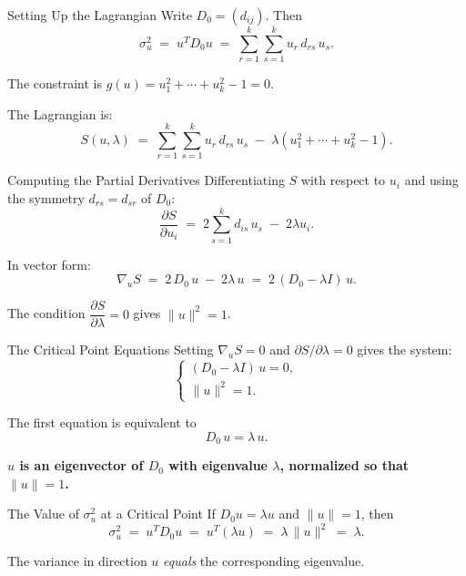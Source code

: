 \documentclass[aspectratio=169]{beamer}
\newcommand{\norm}[1]{\lVert #1 \rVert}
\begin{document}
\begin{frame}{Setting Up the Lagrangian}
  Write $D_{0} = (d_{ij})$.  Then
  \[
    \sigma_{u}^{2} \;=\; u^{T}D_{0}u
    \;=\; \sum_{r=1}^{k}\sum_{s=1}^{k} u_{r}\,d_{rs}\,u_{s}.
  \]

  \medskip
  The constraint is $g(u) = u_{1}^{2}+\cdots+u_{k}^{2}-1 = 0$.

  \medskip
  The Lagrangian is:
  \[
    S(u,\lambda)
    \;=\; \sum_{r=1}^{k}\sum_{s=1}^{k} u_{r}\,d_{rs}\,u_{s}
    \;-\; \lambda\!\left(u_{1}^{2}+\cdots+u_{k}^{2}-1\right).
  \]
\end{frame}

\begin{frame}{Computing the Partial Derivatives}
  Differentiating $S$ with respect to $u_{i}$ and using the symmetry
  $d_{rs} = d_{sr}$ of $D_{0}$:
  \[
    \frac{\partial S}{\partial u_{i}}
    \;=\; 2\sum_{s=1}^{k} d_{is}\,u_{s} \;-\; 2\lambda u_{i}.
  \]

  \medskip
  In vector form:
  \[
    \nabla_{u} S
    \;=\; 2\,D_{0}\,u \;-\; 2\lambda\,u
    \;=\; 2\,(D_{0} - \lambda I)\,u.
  \]

  \medskip
  The condition $\dfrac{\partial S}{\partial\lambda}=0$ gives $\norm{u}^{2}=1$.
\end{frame}

\begin{frame}{The Critical Point Equations}
  Setting $\nabla_{u} S = 0$ and $\partial S/\partial\lambda = 0$ gives
  the system:
  \[
    \begin{cases}
      (D_{0} - \lambda I)\,u = 0, \\[4pt]
      \norm{u}^{2} = 1.
    \end{cases}
  \]

  \medskip
  The first equation is equivalent to
  \[
    \boxed{D_{0}\,u = \lambda\,u.}
  \]

  \bigskip
  \begin{center}
    \textbf{$u$ is an eigenvector of $D_{0}$ with eigenvalue $\lambda$,
    normalized so that $\norm{u}=1$.}
  \end{center}
\end{frame}

\begin{frame}{The Value of $\sigma_{u}^{2}$ at a Critical Point}
  If $D_{0}u = \lambda u$ and $\norm{u}=1$, then
  \[
    \sigma_{u}^{2}
    \;=\; u^{T}D_{0}u
    \;=\; u^{T}(\lambda u)
    \;=\; \lambda\,\norm{u}^{2}
    \;=\; \lambda.
  \]

  \medskip
  The variance in direction $u$ \emph{equals} the corresponding eigenvalue.
\end{frame}
\end{document}
